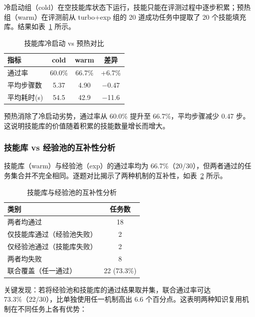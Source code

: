 冷启动组（cold）在空技能库状态下运行，技能只能在评测过程中逐步积累；预热组（warm）在评测前从 turbo+exp 组的 20 道成功任务中提取了 20 个技能填充库。结果如表~\ref{tab:skill-warmup} 所示。

\begin{table}[htbp]
    \centering
    \caption{技能库冷启动 vs 预热对比}
    \label{tab:skill-warmup}
    \begin{tabular}{lccc}
        \toprule
        指标 & cold & warm & 差异 \\
        \midrule
        通过率 & 60.0\% & 66.7\% & +6.7\% \\
        平均步骤数 & 5.37 & 4.90 & $-$0.47 \\
        平均耗时(s) & 54.5 & 42.9 & $-$11.6 \\
        \bottomrule
    \end{tabular}
\end{table}

预热消除了冷启动劣势，通过率从 60.0\% 提升至 66.7\%，平均步骤减少 0.47 步。这说明技能库的价值随着积累的技能数量增长而增大。

\subsubsection{技能库 vs 经验池的互补性分析}

技能库（warm）与经验池（exp）的通过率均为 66.7\%（20/30），但两者通过的任务集合并不完全相同。逐题对比揭示了两种机制的互补性，如表~\ref{tab:skill-complement} 所示。

\begin{table}[htbp]
    \centering
    \caption{技能库与经验池的互补性分析}
    \label{tab:skill-complement}
    \begin{tabular}{lc}
        \toprule
        类别 & 任务数 \\
        \midrule
        两者均通过 & 18 \\
        仅技能库通过（经验池失败） & 2 \\
        仅经验池通过（技能库失败） & 2 \\
        两者均失败 & 8 \\
        \midrule
        联合覆盖（任一通过） & 22 (73.3\%) \\
        \bottomrule
    \end{tabular}
\end{table}

关键发现：若将经验池和技能库的通过结果取并集，联合通过率可达 73.3\%（22/30），比单独使用任一机制高出 6.6 个百分点。这表明两种知识复用机制在不同任务上各有优势：

